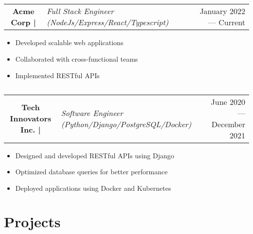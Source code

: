 \documentclass{article}%
\begin{document}
%
\subsection*{}%
\label{subsec:}%
\vspace{-4mm}%
\begin{tabularx}{\textwidth}{cXr}%
\textbf{Acme Corp |}&\textit{Full Stack Engineer (NodeJs/Express/React/Typescript)}&January 2022 — Current\\%
\end{tabularx}%
\begin{itemize}%
\item%
Developed scalable web applications%
\item%
Collaborated with cross{-}functional teams%
\item%
Implemented RESTful APIs%
\end{itemize}

%
\subsection*{}%
\label{subsec:}%
\vspace{-4mm}%
\begin{tabularx}{\textwidth}{cXr}%
\textbf{Tech Innovators Inc. |}&\textit{Software Engineer (Python/Django/PostgreSQL/Docker)}&June 2020 — December 2021\\%
\end{tabularx}%
\begin{itemize}%
\item%
Designed and developed RESTful APIs using Django%
\item%
Optimized database queries for better performance%
\item%
Deployed applications using Docker and Kubernetes%
\end{itemize}

%
\section*{Projects}%
\label{sec:Projects}%

%
\end{document}

